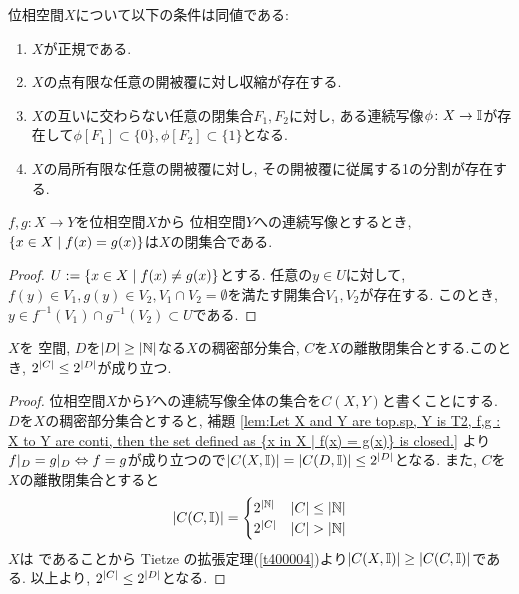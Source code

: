 \documentclass[uplatex, dvipdfmx, a4paper, 12pt, class=jsbook, crop=false]{standalone}
\begin{document}
\begin{theorem}
	位相空間$ X $について以下の条件は同値である:
	\begin{enumerate}
		\item $ X $が正規である.
		\item $ X $の点有限な任意の開被覆に対し収縮が存在する.
		\item $ X $の互いに交わらない任意の閉集合$ F_1, F_2 $に対し, ある連続写像$ \phi \colon X \rightarrow \mathbb{I} $が存在して$ \phi[F_1] \subset \{0\}, \phi[F_2] \subset \{1\} $となる.
		\item $ X $の局所有限な任意の開被覆に対し, その開被覆に従属する1の分割が存在する.
	\end{enumerate}
\end{theorem}

\begin{lemma}
	\label{lem:Let X and Y are top.sp, Y is T2, f,g : X to Y are conti, then the set defined as {x in X | f(x) = g(x)} is closed.}
	$f, g \colon X \to Y $を位相空間$ X $から  位相空間$ Y $への連続写像とするとき, $ \setcomp{x \in X}{f(x) = g(x)} $は$ X $の閉集合である.
\end{lemma}

\begin{proof}
	$ U \defeq \setcomp{x \in X}{f(x) \neq g(x)} $とする. 任意の$ y \in U $に対して, $ f(y) \in V_1, g(y) \in V_2, V_1 \cap V_2 = \emptyset $を満たす開集合$ V_1, V_2 $が存在する. このとき, $ y \in f^{-1}(V_1) \cap g^{-1}(V_2) \subset U $である.
\end{proof}

\begin{theorem}
	\label{thm:Jone's Lemma}
	$ X $を  空間, $ D $を$ \left|D\right| \geq \left|\mathbb{N}\right| $なる$ X $の稠密部分集合, $ C $を$ X $の離散閉集合とする.このとき, $2^{\left|C\right|} \leq 2^{\left|D\right|} $が成り立つ.
\end{theorem}

\begin{proof}
	位相空間$ X $から$ Y $への連続写像全体の集合を$ C(X, Y) $と書くことにする. $ D $を$ X $の稠密部分集合とすると, 補題 \ref{lem:Let X and Y are top.sp, Y is T2, f,g : X to Y are conti, then the set defined as {x in X | f(x) = g(x)} is closed.} より$ f|_D = g|_D  \Leftrightarrow f =g $が成り立つので$ \left|C(X, \mathbb{I})\right| = \left|C(D, \mathbb{I})\right| \leq 2^{\left|D\right|} $となる. また, $ C $を$ X $の離散閉集合とすると
	$$ \left|C(C, \mathbb{I})\right| =\begin{cases}
	2^{\left|\mathbb{N}\right|} & \left|C\right| \leq \left|\mathbb{N}\right|\\
	2^{\left|C\right|} & \left|C\right| > \left|\mathbb{N}\right|
	\end{cases} $$
	$ X $は  であることから Tietze の拡張定理(\cref{t400004})より$ \left|C(X, \mathbb{I})\right| \geq \left|C(C, \mathbb{I})\right| $である. 以上より, $ 2^{\left|C\right|} \leq 2^{\left|D\right|} $となる.
\end{proof}
\end{document}
